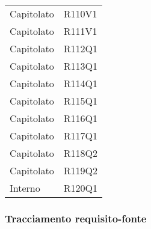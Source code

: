 \documentclass[../analisi-dei-requisiti.tex]{subfiles}
\begin{document}
\begin{longtable}[H]{ p{4cm} | p{4cm} }
  Capitolato                    & R110V1                               \\
  Capitolato                    & R111V1                               \\
  Capitolato                    & R112Q1                               \\
  Capitolato                    & R113Q1                               \\
  Capitolato                    & R114Q1                               \\
  Capitolato                    & R115Q1                               \\
  Capitolato                    & R116Q1                               \\
  Capitolato                    & R117Q1                               \\
  Capitolato                    & R118Q2                               \\
  Capitolato                    & R119Q2                               \\
  Interno                       & R120Q1                               \\
\end{longtable}

\newpage
\subsubsection{Tracciamento requisito-fonte}%
\label{subs:tracciamento_requisito-fonte}
\end{document}
